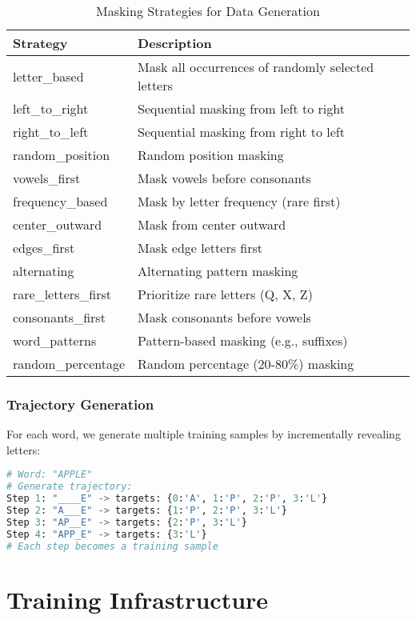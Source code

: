 \documentclass[12pt,a4paper]{article}
\begin{document}
\begin{table}[H]
\centering
\caption{Masking Strategies for Data Generation}
\begin{tabular}{@{}lp{9cm}@{}}
\toprule
\textbf{Strategy} & \textbf{Description} \\
\midrule
letter\_based & Mask all occurrences of randomly selected letters \\
left\_to\_right & Sequential masking from left to right \\
right\_to\_left & Sequential masking from right to left \\
random\_position & Random position masking \\
vowels\_first & Mask vowels before consonants \\
frequency\_based & Mask by letter frequency (rare first) \\
center\_outward & Mask from center outward \\
edges\_first & Mask edge letters first \\
alternating & Alternating pattern masking \\
rare\_letters\_first & Prioritize rare letters (Q, X, Z) \\
consonants\_first & Mask consonants before vowels \\
word\_patterns & Pattern-based masking (e.g., suffixes) \\
random\_percentage & Random percentage (20-80\%) masking \\
\bottomrule
\end{tabular}
\end{table}

\subsubsection{Trajectory Generation}

For each word, we generate multiple training samples by incrementally revealing letters:

\begin{lstlisting}[language=Python, caption={Trajectory Generation Example}]
# Word: "APPLE"
# Generate trajectory:
Step 1: "____E" -> targets: {0:'A', 1:'P', 2:'P', 3:'L'}
Step 2: "A___E" -> targets: {1:'P', 2:'P', 3:'L'}
Step 3: "AP__E" -> targets: {2:'P', 3:'L'}
Step 4: "APP_E" -> targets: {3:'L'}
# Each step becomes a training sample
\end{lstlisting}

\section{Training Infrastructure}
\end{document}
